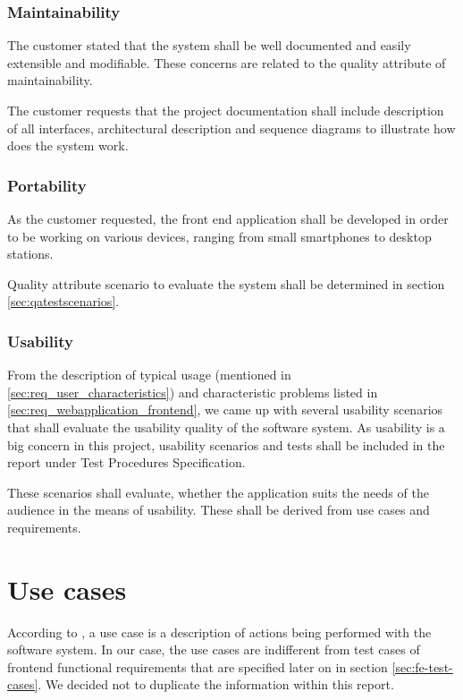 \documentclass[11pt]{book}
\begin{document}
\subsubsection{Maintainability}
The customer stated that the system shall be well documented and easily extensible and modifiable. These concerns are related to the quality attribute of maintainability.

The customer requests that the project documentation shall include description of all interfaces, architectural description and sequence diagrams to illustrate how does the system work.

\subsubsection{Portability}
As the customer requested, the front end application shall be developed in order to be working on various devices, ranging from small smartphones to desktop stations.

Quality attribute scenario to evaluate the system shall be determined in section \ref{sec:qatestscenarios}.

\subsubsection{Usability}\label{sec:req_usability}
From the description of typical usage (mentioned in \ref{sec:req_user_characteristics}) and characteristic problems listed in \ref{sec:req_webapplication_frontend}, we came up with several usability scenarios that shall evaluate the usability quality of the software system. As usability is a big concern in this project, usability scenarios and tests shall be included in the report under Test Procedures Specification.  %

These scenarios shall evaluate, whether the application suits the needs of the audience in the means of usability. These shall be derived from use cases and requirements.

\section{Use cases}

According to \cite{usecases}, a use case is a description of actions being performed with the software system. In our case, the use cases are indifferent from test cases of frontend functional requirements that are specified later on in section \ref{sec:fe-test-cases}. We decided not to duplicate the information within this report.
\end{document}
